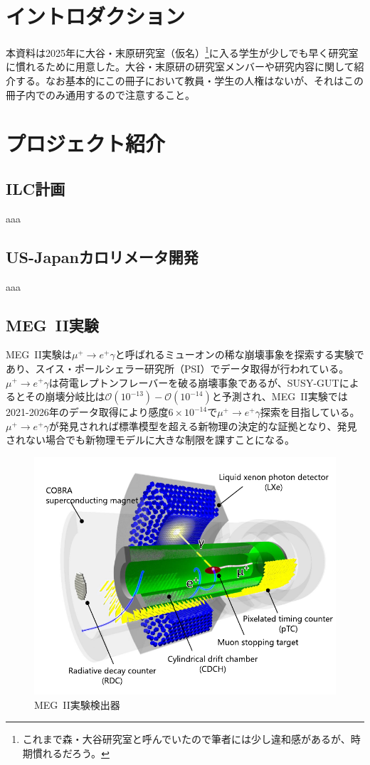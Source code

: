 \section{イントロダクション}

本資料は2025年に大谷・末原研究室（仮名）\footnote{
これまで森・大谷研究室と呼んでいたので筆者には少し違和感があるが、時期慣れるだろう。
}に入る学生が少しでも早く研究室に慣れるために用意した。大谷・末原研の研究室メンバーや研究内容に関して紹介する。なお基本的にこの冊子において教員・学生の人権はないが、それはこの冊子内でのみ通用するので注意すること。

\section{プロジェクト紹介}

\subsection{ILC計画}
aaa

\subsection{US-Japanカロリメータ開発}
aaa

\subsection{MEG~II実験}

MEG~II実験は$\mu^{+}\rightarrow e^{+}\gamma$と呼ばれるミューオンの稀な崩壊事象を探索する実験であり、スイス・ポールシェラー研究所（PSI）でデータ取得が行われている。$\mu^{+}\rightarrow e^{+}\gamma$は荷電レプトンフレーバーを破る崩壊事象であるが、SUSY-GUTによるとその崩壊分岐比は$\mathcal{O}(10^{-13})-\mathcal{O}(10^{-14})$と予測され、MEG~II実験では2021-2026年のデータ取得により感度$6\times10^{-14}$で$\mu^{+}\rightarrow e^{+}\gamma$探索を目指している。$\mu^{+}\rightarrow e^{+}\gamma$が発見されれば標準模型を超える新物理の決定的な証拠となり、発見されない場合でも新物理モデルに大きな制限を課すことになる。

\begin{figure}[h]
  \centering
  \includegraphics[width=0.6\columnwidth ,clip]{fig/MEGIIDetector.pdf}
  \caption{MEG~II実験検出器\cite{Baldini2018}}
  \label{fig:MEGIIDetector}
\end{figure}

